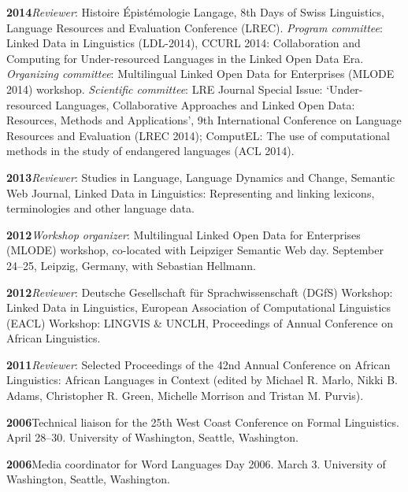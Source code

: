 \documentclass[11pt]{article}
\newcommand{\hangpara}{
 \setlength{\parindent}{0in} %
 \hangindent=0.42in %
}
\begin{document}
\vskip 6pt
\hangpara
{\bf 2014}\hspace{1ex}\textit{Reviewer}: Histoire {\'E}pist{\'e}mologie Langage, 8th Days of Swiss Linguistics, Language Resources and Evaluation Conference (LREC). \textit{Program committee}: Linked Data in Linguistics (LDL-2014), CCURL 2014: Collaboration and Computing for Under-resourced Languages in the Linked Open Data Era. \textit{Organizing committee}: Multilingual Linked Open Data for Enterprises (MLODE 2014) workshop. \textit{Scientific committee}: LRE Journal Special Issue: `Under-resourced Languages, Collaborative Approaches and Linked Open Data: Resources, Methods and Applications', 9th International Conference on Language Resources and Evaluation (LREC 2014); ComputEL: The use of computational methods in the study of endangered languages (ACL 2014).

\vskip 6pt
\hangpara
{\bf 2013}\hspace{1ex}\textit{Reviewer}: Studies in Language, Language Dynamics and Change, Semantic Web Journal, Linked Data in Linguistics: Representing and linking lexicons, terminologies and other language data.

\vskip 6pt
\hangpara
{\bf 2012}\hspace{1ex}\textit{Workshop organizer}: Multilingual Linked Open Data for Enterprises (MLODE) workshop, co-located with Leipziger Semantic Web day. September 24--25, Leipzig, Germany, with Sebastian Hellmann.

\vskip 6pt
\hangpara
{\bf 2012}\hspace{1ex}\textit{Reviewer}: Deutsche Gesellschaft f{\"u}r Sprachwissenschaft (DGfS) Workshop: Linked Data in Linguistics, European Association of Computational Linguistics (EACL) Workshop: LINGVIS \& UNCLH, Proceedings of Annual Conference on African Linguistics.

\vskip 6pt
\hangpara
{\bf 2011}\hspace{1ex}\textit{Reviewer}: Selected Proceedings of the 42nd Annual Conference on African Linguistics: African Languages in Context (edited by Michael R. Marlo, Nikki B. Adams, Christopher R. Green, Michelle Morrison and Tristan M. Purvis).

\vskip 6pt
\hangpara
{\bf 2006}\hspace{1ex}Technical liaison for the 25th West Coast Conference on Formal Linguistics. April 28--30. University of Washington, Seattle, Washington.

\vskip 6pt
\hangpara
{\bf 2006}\hspace{1ex}Media coordinator for Word Languages Day 2006. March 3. University of Washington, Seattle, Washington.	
\end{document}

